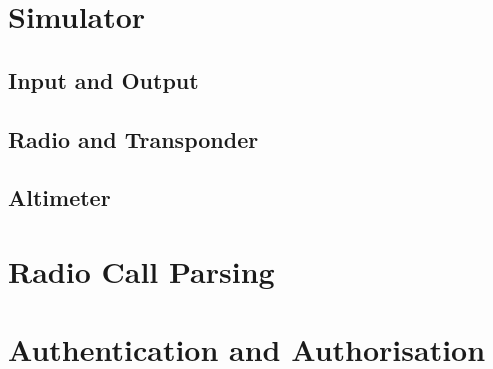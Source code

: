 \section{Simulator}
\label{se:sim}

\subsection{Input and Output}
\label{sse:inputoutput}

\subsection{Radio and Transponder}
\label{sse:radiotransponder}

\subsection{Altimeter}
\label{sse:altimeter}

\section{Radio Call Parsing}
\label{se:parsing}

\section{Authentication and Authorisation}
\label{se:authauthor}
